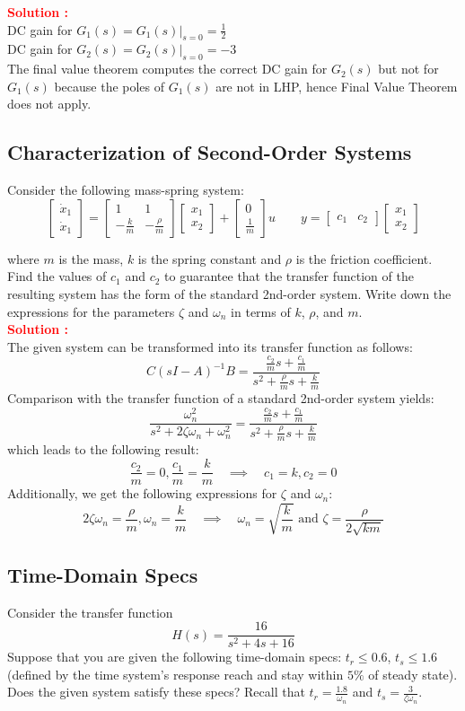 \documentclass[12pt]{article}
\newcommand{\bmat}[1]{\begin{bmatrix} #1 \end{bmatrix}}
\begin{document}
\textbf{\textcolor{red}{Solution :}} \\
DC gain for $G_1(s) = G_1(s)|_{s=0} =\frac{1}{2}$ \\
DC gain for $G_2(s) = G_2(s)|_{s=0} = -3$ \\
The final value theorem computes the correct DC gain for $G_2(s)$ but not for $G_1(s)$ because the poles of $G_1(s)$ are not in LHP, hence Final Value Theorem does not apply.

\clearpage
\subsection{Characterization of Second-Order Systems}

Consider the following mass-spring system:
\[
\bmat{\dot{x}_1 \\ \dot{x}_1} = \bmat{1 & 1 \\ -\frac{k}{m} & -\frac{\rho}{m}}\bmat{x_1 \\ x_2} +\bmat{0 \\ \frac{1}{m}}u \qquad y=\bmat{c_1 & c_2} \bmat{x_1 \\ x_2}
\]

where $m$ is the mass, $k$ is the spring constant and $\rho$ is the friction coefficient. Find the values of $c_1$ and $c_2$ to guarantee that the transfer function of the resulting system has the form of the
standard 2nd-order system. Write down the expressions for the parameters $\zeta$ and $\omega_n$ in terms of $k$, $\rho$, and $m$. \\

\noindent
\textbf{\textcolor{red}{Solution :}} \\
The given system can be transformed into its transfer function as follows:
\[
C(s I -A)^{-1}B=\frac{\frac{c_2}{m}s+\frac{c_1}{m}}{s^2+\frac{\rho}{m}s+\frac{k}{m}}
\]
Comparison with the transfer function of a standard 2nd-order system yields:
\[
\frac{\omega_n^2}{s^2+2 \zeta \omega_n+\omega_n^2}=\frac{\frac{c_2}{m}s+\frac{c_1}{m}}{s^2+\frac{\rho}{m}s+\frac{k}{m}}
\]
which leads to the following result:
\[
\frac{c_2}{m}=0, \frac{c_1}{m}=\frac{k}{m} \quad \implies \quad c_1=k,c_2=0
\]
Additionally, we get the following expressions for $\zeta$ and $\omega_n$:
\[
2 \zeta \omega_n=\frac{\rho}{m}, \omega_n=\frac{k}{m} \quad \implies \quad \omega_n=\sqrt{\frac{k}{m}} \text{  and  } \zeta=\frac{\rho}{2 \sqrt{k m}}
\]

\clearpage
\subsection{Time-Domain Specs}
Consider the transfer function 
\[
H(s)=\frac{16}{s^2+4s+16}
\]
Suppose that you are given the following time-domain specs: $t_r \leq 0.6$, $t_s \leq 1.6$ (defined by the time system's response reach and stay within $5\%$ of steady state). Does the given system satisfy these specs? Recall that $t_r=\frac{1.8}{\omega_n}$ and $t_s=\frac{3}{\zeta \omega_n}$. \\
\end{document}
